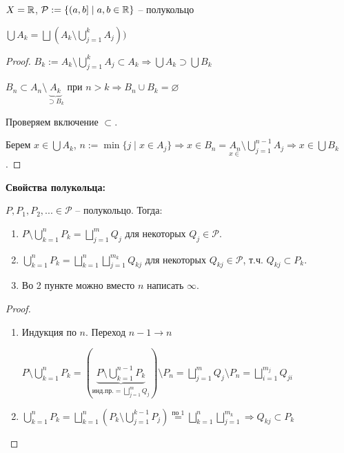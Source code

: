 \begin{example}
    $X=\mathbb{R}$, $\mathcal{P}:=\{ (a, b] \mid a, b\in \mathbb{R}\}$ – полукольцо
\end{example}

\begin{lemma}
    $\bigcup A_k=\bigsqcup (A_k \setminus \bigcup\limits_{j=1}^k A_j))$
\end{lemma}

\begin{proof}
    $B_k := A_k \setminus \bigcup\limits_{j=1}^k A_j \subset A_k \Rightarrow \bigcup A_k \supset \bigcup B_k$

    $B_n \subset A_n \setminus \underbrace{A_k}_{\supset B_k}$ при $n>k\Rightarrow B_n \cup B_k = \varnothing$

    Проверяем включение $\subset$. 
    
    Берем $x\in \bigcup A_k$, $n:=\min \{j\mid x\in A_j\}\Rightarrow x\in B_n=\underset{x\in}{A_n}\setminus {\bigcup\limits_{j=1}^{n-1}} A_j\Rightarrow x\in \bigcup B_k$.
\end{proof}

\begin{theorem}
    \textbf{Свойства полукольца:}

    $P, P_1, P_2, ... \in \mathcal{P}$ – полукольцо. Тогда:
    \begin{enumerate}
        \item $P\setminus \bigcup\limits_{k=1}^n P_k= \bigsqcup\limits_{j=1}^m Q_j$ для некоторых $Q_j\in \mathcal{P}$.
        \item $\bigcup\limits_{k=1}^n P_k=\bigsqcup\limits_{k=1}^n \bigsqcup\limits_{j=1}^{m_k} Q_{kj}$ для некоторых $Q_{kj}\in \mathcal{P}$, т.ч. $Q_{kj}\subset P_k$.
        \item Во 2 пункте можно вместо $n$ написать $\infty$.
    \end{enumerate}
\end{theorem}

\begin{proof}~
    \begin{enumerate}
        \item Индукция по $n$. Переход $n -1 \rightarrow n$
        
        $P \setminus \bigcup\limits_{k=1}^n P_k = (\underbrace{P \setminus \bigcup\limits_{k=1}^{n-1} P_k}_{\text{инд.пр.} = \bigsqcup\limits_{j=1}^m Q_j}) \setminus P_n=\bigsqcup\limits_{j=1}^m Q_j \setminus P_n = \bigsqcup\limits_{i=1}^{m_j} Q_{ji}$

        \item $\bigcup\limits_{k=1}^n P_k = \bigsqcup\limits_{k=1}^n (P_k \setminus \bigcup\limits_{j=1}^{k -1} P_j)\overset{\text{по 1}}{=}\bigsqcup\limits_{k=1}^n \bigsqcup\limits_{j=1}^{m_k}\Rightarrow Q_{kj}\subset P_k$
    \end{enumerate}
\end{proof}

